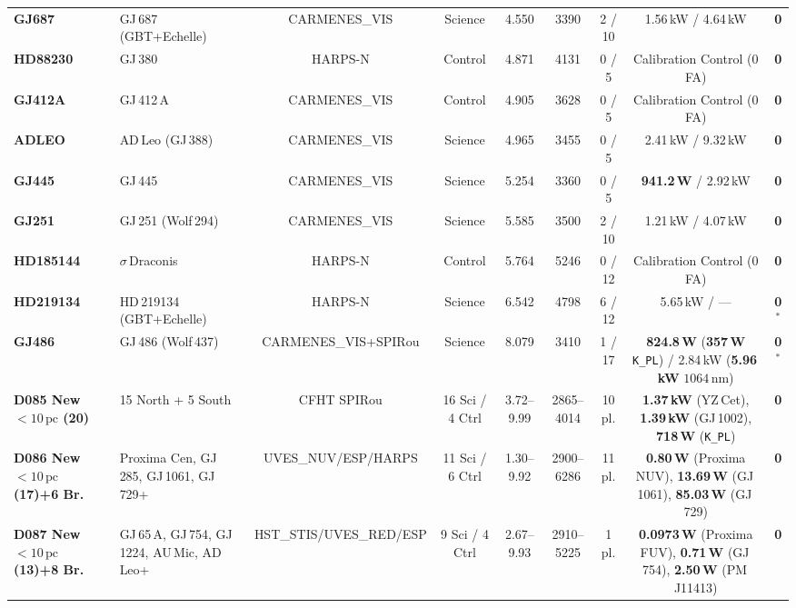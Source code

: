 \documentclass[twocolumn,10pt]{article}
\begin{document}
\begin{table}[p]
{\begin{tabular}{llccccccc}
\textbf{GJ687}        & GJ\,687 (GBT+Echelle)      & CARMENES\_VIS & Science & 4.550 & 3390 & 2 / 10 & 1.56\,kW / 4.64\,kW                          & \textbf{0} \\
\textbf{HD88230}      & GJ\,380                    & HARPS-N       & Control & 4.871 & 4131 & 0 / 5  & Calibration Control (0 FA)                   & \textbf{0} \\
\textbf{GJ412A}       & GJ\,412\,A                 & CARMENES\_VIS & Control & 4.905 & 3628 & 0 / 5  & Calibration Control (0 FA)                   & \textbf{0} \\
\textbf{ADLEO}        & AD\,Leo (GJ\,388)          & CARMENES\_VIS & Science & 4.965 & 3455 & 0 / 5  & 2.41\,kW / 9.32\,kW                          & \textbf{0} \\
\textbf{GJ445}        & GJ\,445                    & CARMENES\_VIS & Science & 5.254 & 3360 & 0 / 5  & \textbf{941.2\,W} / 2.92\,kW                 & \textbf{0} \\
\textbf{GJ251}        & GJ\,251 (Wolf\,294)        & CARMENES\_VIS & Science & 5.585 & 3500 & 2 / 10 & 1.21\,kW / 4.07\,kW                          & \textbf{0} \\
\textbf{HD185144}     & $\sigma$\,Draconis         & HARPS-N       & Control & 5.764 & 5246 & 0 / 12 & Calibration Control (0 FA)                   & \textbf{0} \\
\textbf{HD219134}     & HD\,219134 (GBT+Echelle)   & HARPS-N       & Science & 6.542 & 4798 & 6 / 12 & 5.65\,kW / ---                               & \textbf{0}$^{\ast}$ \\
\textbf{GJ486}        & GJ\,486 (Wolf\,437)        & CARMENES\_VIS+SPIRou & Science & 8.079 & 3410 & 1 / 17 & \textbf{824.8\,W} (\textbf{357\,W} \texttt{K\_PL}) / 2.84\,kW (\textbf{5.96\,kW} $1064\,\text{nm}$) & \textbf{0}$^{\ast}$ \\
\midrule
\textbf{D085 New $<10\,\text{pc}$ (20)} & 15 North + 5 South & CFHT SPIRou & 16 Sci / 4 Ctrl & 3.72--9.99 & 2865--4014 & 10 pl. & \textbf{1.37\,kW} (YZ\,Cet), \textbf{1.39\,kW} (GJ\,1002), \textbf{718\,W} (\texttt{K\_PL}) & \textbf{0} \\
\textbf{D086 New $<10\,\text{pc}$ (17)+6 Br.} & Proxima Cen, GJ\,285, GJ\,1061, GJ\,729+ & UVES\_NUV/ESP/HARPS & 11 Sci / 6 Ctrl & 1.30--9.92 & 2900--6286 & 11 pl. & \textbf{0.80\,W} (Proxima NUV), \textbf{13.69\,W} (GJ\,1061), \textbf{85.03\,W} (GJ\,729) & \textbf{0} \\
\textbf{D087 New $<10\,\text{pc}$ (13)+8 Br.} & GJ\,65\,A, GJ\,754, GJ\,1224, AU\,Mic, AD\,Leo+ & HST\_STIS/UVES\_RED/ESP & 9 Sci / 4 Ctrl & 2.67--9.93 & 2910--5225 & 1 pl. & \textbf{0.0973\,W} (Proxima FUV), \textbf{0.71\,W} (GJ\,754), \textbf{2.50\,W} (PM\,J11413) & \textbf{0} \\

\end{tabular}}
\end{table}
\end{document}
